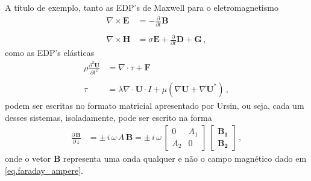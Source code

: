 A t\'itulo de exemplo, tanto as EDP's de Maxwell para o eletromagnetismo
\begin{align}\label{eq.faraday_ampere}\nonumber
\nabla\times\mathbf{E}&=-\frac{\partial}{\partial t}\mathbf{B}\\\\\nonumber
\nabla\times\mathbf{H}&=\sigma\mathbf{E}+\frac{\partial}{\partial t}\mathbf{D}+\mathbf{G}\,,
\end{align}
como as EDP's el\'asticas
\begin{align}\label{eq.cauchy_hooke}\nonumber
\rho\frac{\partial^2 \mathbf{U}}{\partial t^2}&=\nabla\cdot\tau+\mathbf{F}\\\\\nonumber
\tau&=\lambda\nabla\cdot \mathbf{U}\cdot I + \mu(\nabla \mathbf{U}+\nabla \mathbf{U}^*)\,,
\end{align}
podem ser escritas no formato matricial apresentado por Ursin, ou seja, cada um desses sistemas, isoladamente, pode ser escrito na forma 
\begin{align}\label{eq.matricial}
\frac{\partial\,\mathbf{B}}{\partial\,z} &= \pm\,i\,\omega\,A\,\mathbf{B} = \pm\,i\,\omega\,
\begin{bmatrix}
0&A_1\\
A_2&0
\end{bmatrix}\,
\begin{bmatrix}
\mathbf{B_1}\\
\mathbf{B_2}	
\end{bmatrix}\,,
\end{align}
onde o vetor $\mathbf{B}$ representa uma onda qualquer e n\~ao o campo magn\'etico dado em \ref{eq.faraday_ampere}.

